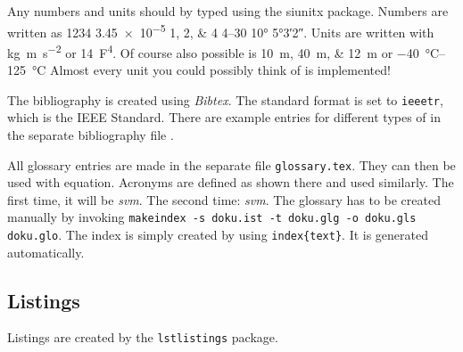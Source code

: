 %
Any numbers and units should by typed using the siunitx package.
Numbers are written as \num{1234} \num{3.45e-5} \numlist{1;2;4} \numrange{4}{30} \ang{10} \ang{5;3;2}.
Units are written with \si{\kilo\gram\meter\per\square\second} or \SI{14}{\farad\tothe{4}}.
Of course also possible is \SIlist{10;40;12}{\meter} or \SIrange{-40}{+125}{\degreeCelsius}
Almost every unit you could possibly think of is implemented!

%
The bibliography is created using \emph{Bibtex}. The
standard format is set to \texttt{ieeetr}, which is the IEEE Standard. There
are example entries for different types of  in the separate bibliography file
\cite{article} \cite{book} \cite{booklet} \cite{conference} \cite{inbook}
\cite{incollection} \cite{manual} \cite{mastersthesis} \cite{misc}
\cite{phdthesis} \cite{proceedings} \cite{techreport} \cite{unpublished}.

%
All glossary entries are made in the separate file \texttt{glossary.tex}.
They can then be used with \gls{equation}.
Acronyms are defined as shown there and used similarly. 
The first time, it will be \emph{\gls{svm}}.
The second time: \emph{\gls{svm}}.
The glossary has to be created manually by invoking \texttt{makeindex -s doku.ist -t doku.glg -o doku.gls doku.glo}.
The index is simply created by using \texttt{index\{text\}}. It is generated automatically.

\subsection{Listings}
Listings are created by the \texttt{lstlistings} package.


\citationneeded